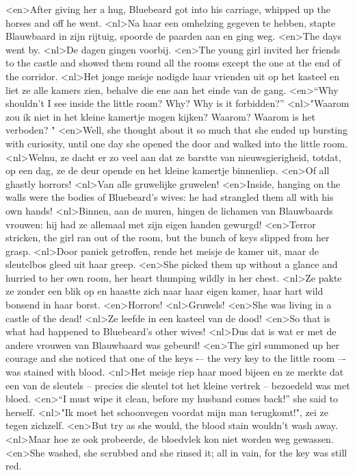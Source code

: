 <en>After giving her a hug, Bluebeard got into his carriage, whipped up the horses and off he went.
<nl>Na haar een omhelzing gegeven te hebben, stapte Blauwbaard in zijn rijtuig, spoorde  de paarden aan en ging weg.
<en>The days went by.
<nl>De dagen gingen voorbij.
<en>The young girl invited her friends to the castle and showed them round all the rooms except the one at the end of the corridor.
<nl>Het jonge meisje nodigde haar vrienden uit op het kasteel en liet ze alle kamers zien, behalve die ene aan het einde van de gang.
<en>“Why shouldn’t I see inside the little room? Why? Why is it forbidden?” 
<nl>"Waarom zou ik niet in het kleine kamertje mogen kijken? Waarom? Waarom is het verboden? "
<en>Well, she thought about it so much that she ended up bursting with curiosity, until one day she opened the door and walked into the little room.
<nl>Welnu, ze dacht er zo veel aan dat ze barstte van nieuwsgierigheid, totdat,  op een dag, ze de deur opende en het kleine kamertje binnenliep.
<en>Of all ghastly horrors!
<nl>Van alle gruwelijke gruwelen!
<en>Inside, hanging on the walls were the bodies of Bluebeard’s wives: he had strangled them all with his own hands!
<nl>Binnen, aan de muren, hingen de lichamen van Blauwbaards  vrouwen: hij had ze allemaal met zijn eigen handen gewurgd!
<en>Terror stricken, the girl ran out of the room, but the bunch of keys slipped from her grasp.
<nl>Door paniek getroffen, rende het meisje de kamer uit, maar de sleutelbos gleed uit haar greep.
<en>She picked them up without a glance and hurried to her own room, her heart thumping wildly in her chest.
<nl>Ze pakte ze zonder een blik op en haastte zich naar haar eigen kamer, haar hart wild bonsend in haar borst.
<en>Horrors!
<nl>Gruwels!
<en>She was living in a castle of the dead!
<nl>Ze leefde in een kasteel van de dood!
<en>So that is what had happened to Bluebeard’s other wives!
<nl>Dus dat is wat er met de andere vrouwen van Blauwbaard was gebeurd!
<en>The girl summoned up her courage and she noticed that one of the keys -– the very key to the little room –- was stained with blood.
<nl>Het meisje riep haar moed bijeen en ze merkte dat een van de sleutels -- precies die sleutel tot het kleine vertrek -- bezoedeld was met bloed.
<en>“I must wipe it clean, before my husband comes back!” she said to herself.
<nl>"Ik moet het schoonvegen voordat mijn man terugkomt!", zei ze tegen zichzelf.
<en>But try as she would, the blood stain wouldn’t wash away.
<nl>Maar hoe ze ook probeerde, de bloedvlek kon niet worden weg gewassen.
<en>She washed, she scrubbed and she rinsed it; all in vain, for the key was still red.
